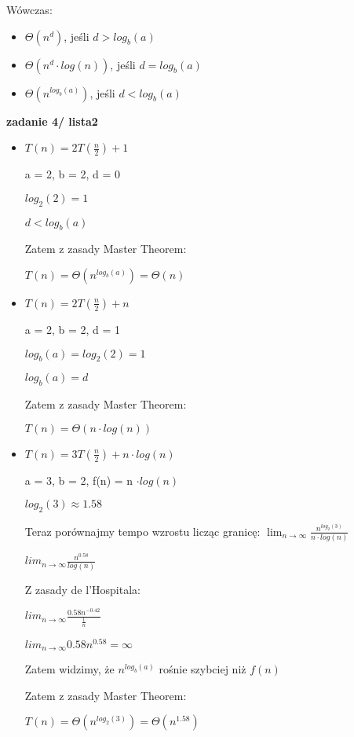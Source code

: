 \documentclass{article}
\begin{document}
    Wówczas: \par
    \begin{itemize}
        \item $\Theta(n^d)$, jeśli $d > log_b(a)$ \par
        \item $\Theta(n^d \cdot log(n))$, jeśli $d = log_b(a)$ \par
        \item $\Theta(n^{log_b(a)})$, jeśli $d < log_b(a)$ \par
    \end{itemize} \par
    \vspace{1\baselineskip}
    \textbf{zadanie 4/ lista2} \par
    \vspace{1\baselineskip}
    \begin{itemize}
        \item $T(n) = 2T(\frac{n}{2}) + 1$ \par
        a = 2, b = 2, d = 0 \par
        $log_2(2) = 1$ \par
        $d < log_b(a)$ \par
        Zatem z zasady Master Theorem: \par
        $T(n) = \Theta(n^{log_b(a)}) = \Theta(n)$ \par
        \item $T(n) = 2T(\frac{n}{2}) + n$ \par
        a = 2, b = 2, d = 1 \par
        $log_b(a) = log_2(2) = 1$ \par
        $log_b(a) = d$ \par
        Zatem z zasady Master Theorem: \par
        $T(n) = \Theta(n \cdot log(n))$ \par
        \item $T(n) = 3T(\frac{n}{2}) + n \cdot log(n)$ \par
        a = 3, b = 2, f(n) = n $\cdot log(n)$ \par
        $log_2(3) \approx 1.58$ \par
        Teraz porównajmy tempo wzrostu licząc granicę: $\lim_{n \to \infty} \frac{n^{log_2(3)}}{n \cdot log(n)}$ \par
        $lim_{n \to \infty} \frac{n^{0.58}}{log(n)}$ \par
        Z zasady de l'Hospitala: \par
        $lim_{n \to \infty} \frac{0.58n^{-0.42}}{\frac{1}{n}}$ \par
        $lim_{n \to \infty} 0.58n^{0.58} = \infty$ \par
        Zatem widzimy, że $n^{log_b(a)}$ rośnie szybciej niż $f(n)$ \par
        Zatem z zasady Master Theorem: \par
        $T(n) = \Theta(n^{log_2(3)}) = \Theta(n^{1.58})$ \par
    \end{itemize}
\end{document}
